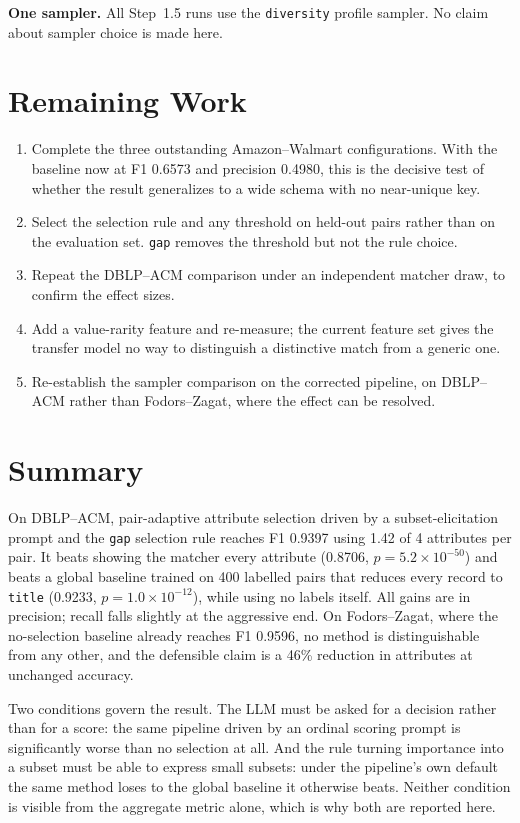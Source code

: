 \documentclass[11pt]{article}
\begin{document}
\textbf{One sampler.} All Step~1.5 runs use the \texttt{diversity} profile sampler. No claim
about sampler choice is made here.

\section{Remaining Work}

\begin{enumerate}
\item Complete the three outstanding Amazon--Walmart configurations. With the baseline now
      at F1 0.6573 and precision 0.4980, this is the decisive test of whether the result
      generalizes to a wide schema with no near-unique key.
\item Select the selection rule and any threshold on held-out pairs rather than on the
      evaluation set. \texttt{gap} removes the threshold but not the rule choice.
\item Repeat the DBLP--ACM comparison under an independent matcher draw, to confirm the
      effect sizes.
\item Add a value-rarity feature and re-measure; the current feature set gives the transfer
      model no way to distinguish a distinctive match from a generic one.
\item Re-establish the sampler comparison on the corrected pipeline, on DBLP--ACM rather than
      Fodors--Zagat, where the effect can be resolved.
\end{enumerate}

\section{Summary}

On DBLP--ACM, pair-adaptive attribute selection driven by a subset-elicitation prompt and the
\texttt{gap} selection rule reaches F1 0.9397 using 1.42 of 4 attributes per pair. It beats
showing the matcher every attribute (0.8706, $p = 5.2\times10^{-50}$) and beats a global
baseline trained on 400 labelled pairs that reduces every record to \texttt{title} (0.9233,
$p = 1.0\times10^{-12}$), while using no labels itself. All gains are in precision; recall
falls slightly at the aggressive end. On Fodors--Zagat, where the no-selection baseline
already reaches F1 0.9596, no method is distinguishable from any other, and the defensible
claim is a 46\% reduction in attributes at unchanged accuracy.

Two conditions govern the result. The LLM must be asked for a decision rather than for a
score: the same pipeline driven by an ordinal scoring prompt is significantly worse than no
selection at all. And the rule turning importance into a subset must be able to express small
subsets: under the pipeline's own default the same method loses to the global baseline it
otherwise beats. Neither condition is visible from the aggregate metric alone, which is why
both are reported here.
\end{document}
